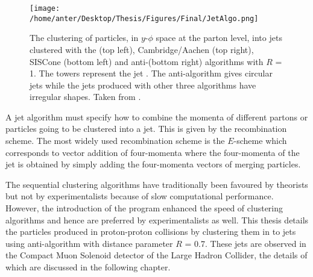 \begin{figure}[!h]
\begin{center}
\hspace*{-10mm}
\texttt{[image: /home/anter/Desktop/Thesis/Figures/Final/JetAlgo.png]}\\
\vspace*{4mm}
\caption[The clustering of particles into jets using different jet algorithms.]{The clustering of particles, in $y$-$\phi$ space at the parton level, into jets clustered with the \kt (top left), Cambridge/Aachen (top right), SISCone (bottom left) and anti-\kt (bottom right) algorithms with $R$ = 1. The towers represent the jet \pt. The anti-\kt algorithm gives circular jets while the jets produced with other three algorithms have irregular shapes. Taken from \cite{Salam:2009jx}.}
\label{fig:jet_algo}
\end{center}
\end{figure}

A jet algorithm must specify how to combine the momenta of different partons or particles going to be clustered into a jet. This is given by the recombination scheme. The most widely used recombination scheme is the $E$-scheme \cite{Blazey:2000qt} which corresponds to vector addition of four-momenta where the four-momenta of the jet is obtained by simply adding the four-momenta vectors of merging particles.
 
The sequential clustering algorithms have traditionally been favoured by theorists but not by experimentalists because of slow computational performance. However, the introduction of the \fastjet program \cite{Cacciari:2011ma} enhanced the speed of clustering algorithms and hence are preferred by experimentalists as well. This thesis details the particles produced in proton-proton collisions by clustering them in to jets using anti-\kt algorithm with distance parameter $R$ = 0.7. These jets are observed in the Compact Muon Solenoid detector of the Large Hadron Collider, the details of which are discussed in the following chapter.

